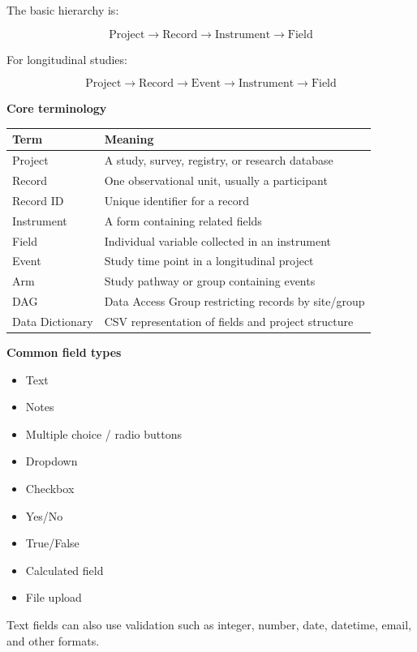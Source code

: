 \documentclass[11pt,letterpaper]{article}
\begin{document}
The basic hierarchy is:

\[
\text{Project}
\rightarrow
\text{Record}
\rightarrow
\text{Instrument}
\rightarrow
\text{Field}
\]

For longitudinal studies:

\[
\text{Project}
\rightarrow
\text{Record}
\rightarrow
\text{Event}
\rightarrow
\text{Instrument}
\rightarrow
\text{Field}
\]

\textbf{Core terminology}

\begin{center}
\begin{tabularx}{\textwidth}{lX}
\toprule
Term & Meaning \\
\midrule
Project & A study, survey, registry, or research database \\
Record & One observational unit, usually a participant \\
Record ID & Unique identifier for a record \\
Instrument & A form containing related fields \\
Field & Individual variable collected in an instrument \\
Event & Study time point in a longitudinal project \\
Arm & Study pathway or group containing events \\
DAG & Data Access Group restricting records by site/group \\
Data Dictionary & CSV representation of fields and project structure \\
\bottomrule
\end{tabularx}
\end{center}

\textbf{Common field types}

\begin{itemize}[leftmargin=*]
    \item Text
    \item Notes
    \item Multiple choice / radio buttons
    \item Dropdown
    \item Checkbox
    \item Yes/No
    \item True/False
    \item Calculated field
    \item File upload
\end{itemize}

Text fields can also use validation such as integer, number, date, datetime,
email, and other formats.
\end{document}
